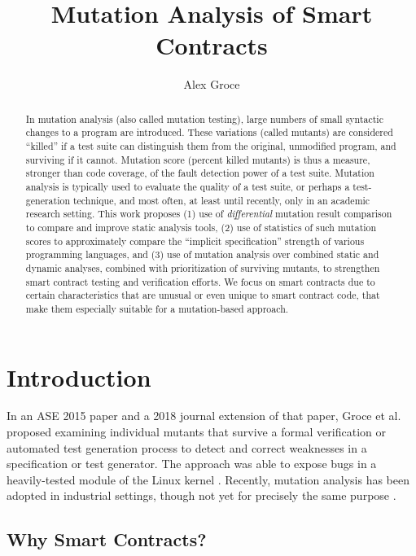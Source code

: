 \documentclass{article}
\title{Mutation Analysis of Smart Contracts}
\author{Alex Groce}
\begin{document}
\maketitle

\begin{abstract}
In mutation analysis (also called mutation testing), large numbers of small syntactic changes to a program are introduced.  These variations (called mutants) are considered ``killed'' if a test suite can distinguish them from the original, unmodified program, and surviving if it cannot.  Mutation score (percent killed mutants) is thus a measure, stronger than code coverage, of the fault detection power of a test suite.
Mutation analysis is typically used to evaluate the quality of a test suite, or perhaps a test-generation technique, and most often, at least until recently, only in an academic research setting.  This work proposes (1) use of \emph{differential} mutation result comparison to compare and improve static analysis tools, (2) use of statistics of such mutation scores to approximately compare the ``implicit specification'' strength of various programming languages, and (3) use of mutation analysis over combined static and dynamic analyses, combined with prioritization of surviving mutants, to strengthen smart contract testing and verification efforts.  We focus on smart contracts due to certain characteristics that are unusual or even unique to smart contract code, that make them especially suitable for a mutation-based approach.
\end{abstract}

\section{Introduction}

In an ASE 2015 \cite{groce2015verified} paper and a 2018 journal extension \cite{groce2018verified} of that paper, Groce et al. proposed examining individual mutants that survive a formal verification or automated test generation process to detect and correct weaknesses in a specification or test generator.  The approach was able to expose bugs in a heavily-tested module of the Linux kernel \cite{mutKernel}.  Recently, mutation analysis has been adopted in industrial settings, though not yet for precisely the same purpose \cite{MutGoogle,ivankovic2018industrial}.

\subsection{Why Smart Contracts?}
\end{document}
